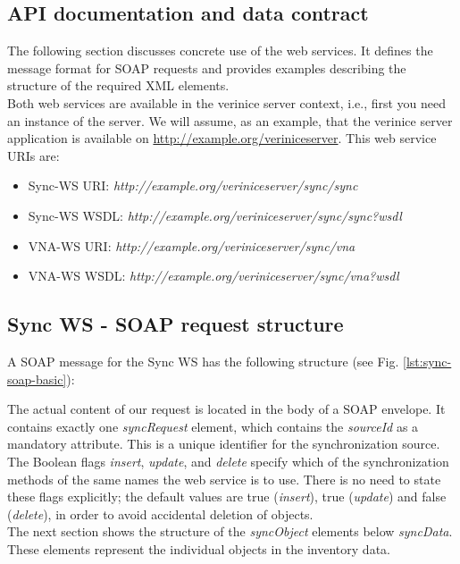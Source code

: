 \documentclass[a4paper,10pt]{book}
\begin{document}
\subsection{ API documentation and data contract} \label{API documentation and data contract}
The following section discusses concrete use of the web services. It defines the message format for SOAP requests and
provides examples describing the structure of the required XML elements.
\newline\\
Both web services are available in the verinice server context, i.e., first you need an instance of the server. We will assume, as an
example, that the verinice server application is available on
\newline
\href{http://example.org/veriniceserver}{http://example.org/veriniceserver}.
\newline
This web service URIs are:
\begin{itemize}
 \item Sync-WS URI: \textit{http://example.org/veriniceserver/sync/sync}
 \item Sync-WS WSDL: \textit{http://example.org/veriniceserver/sync/sync?wsdl}
 \item VNA-WS URI: \textit{http://example.org/veriniceserver/sync/vna}
 \item VNA-WS WSDL: \textit{http://example.org/veriniceserver/sync/vna?wsdl}
\end{itemize}

\subsection{Sync WS - SOAP request structure}
A SOAP message for the Sync WS has the following structure (see Fig. \ref{lst:sync-soap-basic}):
\newline

\lstset{language=XML}


The actual content of our request is located in the body of a SOAP envelope. It contains exactly one
\textit{syncRequest} element, which contains the \textit{sourceId} as a mandatory attribute.
This is a unique identifier for the synchronization source. The Boolean flags \textit{insert}, \textit{update},
and \textit{delete} specify which of the synchronization methods of the same names the web service is to use.
There is no need to state these flags explicitly; the default values are true (\textit{insert}), true (\textit{update}) and
false (\textit{delete}), in order to avoid accidental deletion of objects.
\newline\\
The next section shows the structure of the \textit{syncObject} elements below \textit{syncData}.
These elements represent the individual objects in the inventory data.
\end{document}
